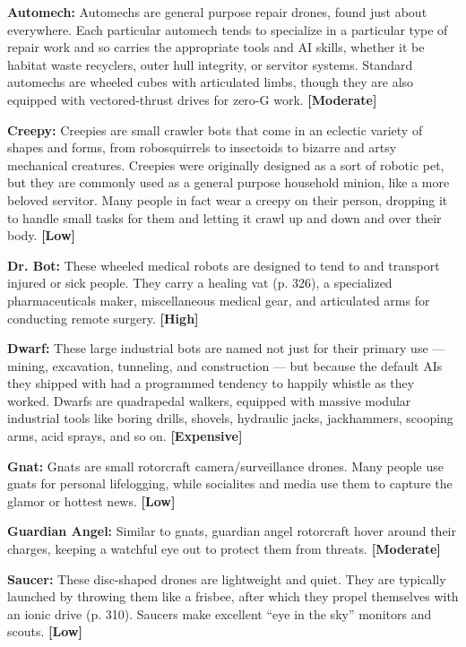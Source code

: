 \textbf{Automech:} Automechs are general purpose repair drones, found just about everywhere. Each particular automech tends to specialize in a particular type of repair work and so carries the appropriate tools and AI skills, whether it be habitat waste recyclers, outer hull integrity, or servitor systems. Standard automechs are wheeled cubes with articulated limbs, though they are also equipped with vectored-thrust drives for zero-G work. \textbf{[Moderate]} 

\textbf{Creepy:} Creepies are small crawler bots that come in an eclectic variety of shapes and forms, from robosquirrels to insectoids to bizarre and artsy mechanical creatures. Creepies were originally designed as a sort of robotic pet, but they are commonly used as a general purpose household minion, like a more beloved servitor. Many people in fact wear a creepy on their person, dropping it to handle small tasks for them and letting it crawl up and down and over their body. \textbf{[Low]} 

\textbf{Dr. Bot:} These wheeled medical robots are designed to tend to and transport injured or sick people. They carry a healing vat (p. 326), a specialized pharmaceuticals maker, miscellaneous medical gear, and articulated arms for conducting remote surgery. \textbf{[High]} 

\textbf{Dwarf:} These large industrial bots are named not just for their primary use --- mining, excavation, tunneling, and construction --- but because the default AIs they shipped with had a programmed tendency to happily whistle as they worked. Dwarfs are quadrapedal walkers, equipped with massive modular industrial tools like boring drills, shovels, hydraulic jacks, jackhammers, scooping arms, acid sprays, and so on. \textbf{[Expensive]} 

\textbf{Gnat:} Gnats are small rotorcraft camera/surveillance drones. Many people use gnats for personal lifelogging, while socialites and media use them to capture the glamor or hottest news. \textbf{[Low]} 

\textbf{Guardian Angel:} Similar to gnats, guardian angel rotorcraft hover around their charges, keeping a watchful eye out to protect them from threats. \textbf{[Moderate]} 

\textbf{Saucer:} These disc-shaped drones are lightweight and quiet. They are typically launched by throwing them like a frisbee, after which they propel themselves with an ionic drive (p. 310). Saucers make excellent ``eye in the sky'' monitors and scouts. \textbf{[Low]} 

